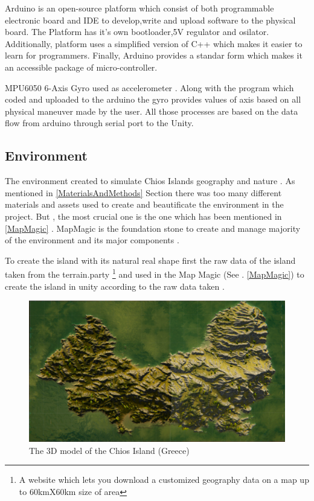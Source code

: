 Arduino is an open-source platform which consist of both programmable electronic board and IDE to develop,write and upload software to the physical board. The Platform has it's own bootloader,5V regulator and osilator. Additionally, platform uses a simplified version of C++ which makes it easier to learn for programmers. Finally, Arduino provides a standar form which makes it an accessible package of micro-controller. 

MPU6050 6-Axis Gyro  used as accelerometer . Along with the program which coded and uploaded to the arduino the gyro provides values of axis based on all physical maneuver made by the user. All those processes are based on  the data flow from arduino through serial port to the Unity.

\subsection{Environment}

The environment created to simulate Chios Islands geography and nature . As mentioned in \ref{MaterialsAndMethods} Section there was too many different materials and assets used to create and beautificate the environment in the project. But , the most crucial one is the one which has been mentioned in \ref{MapMagic}  . MapMagic is the foundation stone to create and manage majority of the environment and its major components .

To create the island with its natural real shape first the raw data of the island taken from the terrain.party \footnote{A website which lets you download a customized geography data on a map up to 60kmX60km size of area} and used in the Map Magic (See . \ref{MapMagic}) to create the island in unity according to the raw data taken .

\begin{figure}[ht]
    \centering
    \includegraphics[scale=.3]{Images/island_lookover.png}
    \caption{The 3D model of the  Chios Island (Greece)}
    \label{fig:island}
\end{figure}

